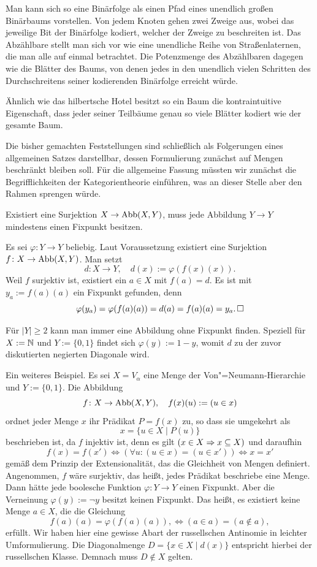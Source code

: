 Man kann sich so eine Binärfolge als einen Pfad eines unendlich großen
Binärbaums vorstellen. Von jedem Knoten gehen zwei Zweige aus, wobei
das jeweilige Bit der Binärfolge kodiert, welcher der Zweige zu
beschreiten ist. Das Abzählbare stellt man sich vor wie eine
unendliche Reihe von Straßenlaternen, die man alle auf einmal
betrachtet. Die Potenzmenge des Abzählbaren dagegen wie die Blätter
des Baums, von denen jedes in den unendlich vielen Schritten des
Durchschreitens seiner kodierenden Binärfolge erreicht würde.

Ähnlich wie das hilbertsche Hotel besitzt so ein Baum die kontraintuitive
Eigenschaft, dass jeder seiner Teilbäume genau so viele Blätter
kodiert wie der gesamte Baum.

Die bisher gemachten Feststellungen sind schließlich als Folgerungen
eines allgemeinen Satzes darstellbar, dessen Formulierung zunächst
auf Mengen beschränkt bleiben soll. Für die allgemeine Fassung
müssten wir zunächst die Begrifflichkeiten der Kategorientheorie
einführen, was an dieser Stelle aber den Rahmen sprengen würde.

\begin{Satz}%
\label{Fixpunktsatz-Lawvere}\newlinefirst
Existiert eine Surjektion $X\to\operatorname{Abb}(X,Y)$, muss jede Abbildung
$Y\to Y$ mindestens einen Fixpunkt besitzen.
\end{Satz}
\begin{Beweis}
Es sei $\varphi\colon Y\to Y$ beliebig. Laut Voraussetzung
existiert eine Surjektion $f\colon X\to\operatorname{Abb}(X,Y)$. Man setzt
\[d\colon X\to Y,\quad d(x) := \varphi(f(x)(x)).\]
Weil $f$ surjektiv ist, existiert ein $a\in X$ mit $f(a)=d$.
Es ist mit $y_a:=f(a)(a)$ ein Fixpunkt gefunden, denn
\[\varphi(y_a) = \varphi(f(a)(a)) = d(a) = f(a)(a) = y_a.\,\Box\]
\end{Beweis}

\noindent
Für $|Y|\ge 2$ kann man immer eine Abbildung ohne Fixpunkt finden.
Speziell für $X:=\mathbb N$ und $Y:=\{0,1\}$ findet sich $\varphi(y) := 1-y$,
womit $d$ zu der zuvor diskutierten negierten Diagonale wird.

Ein weiteres Beispiel. Es sei $X=V_\alpha$ eine Menge der
Von"=Neumann-Hierarchie und $Y := \{0,1\}$. Die Abbildung%
\[f\colon X\to\operatorname{Abb}(X,Y),\quad f(x)(u) := (u\in x)\]
ordnet jeder Menge $x$ ihr Prädikat $P=f(x)$ zu, so dass sie
umgekehrt als%
\[x = \{u\in X\mid P(u)\}\]
beschrieben ist, da $f$ injektiv ist, denn es gilt $(x\in X\Rightarrow x\subseteq X)$
und daraufhin
\[f(x) = f(x') \iff (\forall u\colon (u\in x) = (u\in x'))
\iff x = x'\]
gemäß dem Prinzip der Extensionalität, das die Gleichheit von Mengen
definiert. Angenommen, $f$ wäre surjektiv, das heißt, jedes Prädikat
beschriebe eine Menge. Dann hätte jede boolesche Funktion
$\varphi\colon Y\to Y$ einen Fixpunkt. Aber die Verneinung
$\varphi(y):=\lnot y$ besitzt keinen Fixpunkt. Das heißt, es existiert
keine Menge $a\in X$, die die Gleichung%
\[f(a)(a) = \varphi(f(a)(a)), \iff (a\in a) = (a\notin a),\]
erfüllt. Wir haben hier eine gewisse Abart der russellschen Antinomie%
 in leichter Umformulierung. Die Diagonalmenge
$D = \{x\in X\mid d(x)\}$ entspricht hierbei der russellschen Klasse.
Demnach muss $D\notin X$ gelten.

